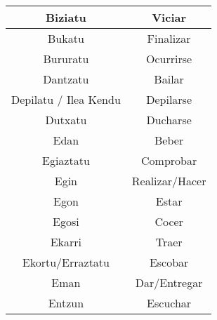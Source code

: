 \documentclass[11pt, a4paper]{article}
\begin{document}
\begin{table}[h]
\begin{tabular}{cc}
		                        Biziatu                          &                             Viciar                             \\ \hline
		                         Bukatu                          &                           Finalizar                            \\ \hline
		                        Bururatu                         &                           Ocurrirse                            \\ \hline
		                        Dantzatu                         &                             Bailar                             \\ \hline
		                 Depilatu / Ilea Kendu                   &                           Depilarse                            \\ \hline
		                        Dutxatu                          &                            Ducharse                            \\ \hline
		                          Edan                           &                             Beber                              \\ \hline
		                       Egiaztatu                         &                           Comprobar                            \\ \hline
		                          Egin                           &                         Realizar/Hacer                         \\ \hline
		                          Egon                           &                             Estar                              \\ \hline
		                         Egosi                           &                             Cocer                              \\ \hline
		                         Ekarri                          &                             Traer                              \\ \hline
		                    Ekortu/Erraztatu                     &                            Escobar                             \\ \hline
		                          Eman                           &                          Dar/Entregar                          \\ \hline
		                         Entzun                          &                            Escuchar                            \\ \hline

\end{tabular}
\end{table}
\end{document}
